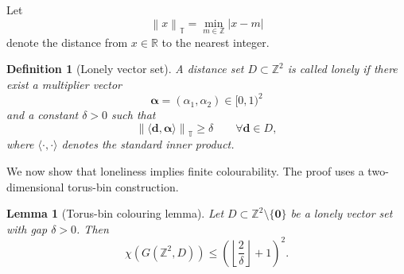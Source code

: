 \documentclass[11pt,fleqn]{article}
\newtheorem{lemma}{Lemma}
\newtheorem{definition}{Definition}
\newcommand{\Z}{\mathbb{Z}}
\newcommand{\R}{\mathbb{R}}
\newcommand{\T}{\mathbb{T}}
\newcommand{\norm}[1]{\left\|#1\right\|}
\newcommand{\abs}[1]{\left|#1\right|}
\newcommand{\floor}[1]{\left\lfloor#1\right\rfloor}
\begin{document}
Let
\[
\norm{x}_{\T}=\min_{m\in \Z}\abs{x-m}
\]
denote the distance from $x\in \R$ to the nearest integer.

\begin{definition}[Lonely vector set]
A distance set $D\subset \Z^2$ is called \emph{lonely} if there exist a multiplier vector
\[
\boldsymbol\alpha=(\alpha_1,\alpha_2)\in [0,1)^2
\]
and a constant $\delta>0$ such that
\begin{equation}
    \norm{\langle \mathbf d,\boldsymbol\alpha\rangle}_{\T}\ge \delta
    \qquad
    \forall \mathbf d\in D,
\end{equation}
where $\langle\cdot,\cdot\rangle$ denotes the standard inner product.
\end{definition}

We now show that loneliness implies finite colourability. The proof uses a two-dimensional torus-bin construction.

\begin{lemma}[Torus-bin colouring lemma]
Let $D\subset \Z^2\setminus\{\mathbf 0\}$ be a lonely vector set with gap $\delta>0$. Then
\begin{equation}
    \chi(G(\Z^2,D))
    \le
    \left(\floor{\frac{2}{\delta}}+1\right)^2.
\end{equation}
\end{lemma}
\end{document}
